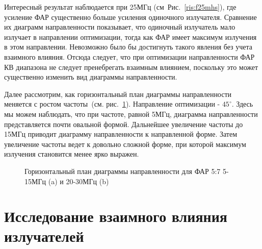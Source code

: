 Интересный результат наблюдается при 25МГц (см~Рис.~\ref{ris:f25mhs}), где усиление ФАР существенно больше усиления одиночного излучателя. Сравнение их диаграмм направленности показывает, что одиночный излучатель мало излучает в направлении оптимизации, тогда как ФАР имеет максимум излучения в этом направлении. Невозможно было бы достигнуть такого явления без учета взаимного влияния. Отсюда следует, что при оптимизации направленности ФАР КВ диапазона не следует пренебрегать взаимным влиянием, поскольку это может существенно изменить вид диаграммы направленности.

Далее рассмотрим, как горизонтальный план диаграммы направленности меняется с ростом частоты~(см. рис.~\ref{ris:horizontal}). Направление оптимизации - $45^{\circ}$. Здесь мы можем наблюдать, что при частоте, равной 5МГц, диаграмма направленности представляется почти овальной формой. Дальнейшее увеличение частоты до 15МГц приводит диаграмму направленности к направленной форме. Затем увеличение частоты ведет к довольно сложной форме, при которой максимум излучения становится менее ярко выражен.

\begin{figure}
\begin{minipage}[h]{0.49\linewidth}
\end{minipage}
\hfill
\begin{minipage}[h]{0.49\linewidth}
\end{minipage}
\caption{Горизонтальный план диаграммы направленности для ФАР 5:7 5-15МГц (a) и 20-30МГц (b)}
\label{ris:horizontal}
\end{figure}

\section{Исследование взаимного влияния излучателей}

